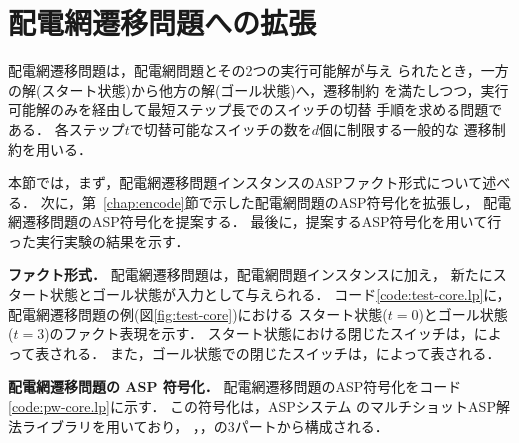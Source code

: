 \section{配電網遷移問題への拡張}\label{chap:core}




配電網遷移問題は，配電網問題とその2つの実行可能解が与え
られたとき，一方の解(スタート状態)から他方の解(ゴール状態)へ，遷移制約
を満たしつつ，実行可能解のみを経由して最短ステップ長でのスイッチの切替
手順を求める問題である．
各ステップ$t$で切替可能なスイッチの数を$d$個に制限する一般的な
遷移制約を用いる．

本節では，まず，配電網遷移問題インスタンスのASPファクト形式について述べる．
次に，第~\ref{chap:encode}節で示した配電網問題のASP符号化を拡張し，
配電網遷移問題のASP符号化を提案する．
最後に，提案するASP符号化を用いて行った実行実験の結果を示す．

\textbf{ファクト形式．}
配電網遷移問題は，配電網問題インスタンスに加え，
新たにスタート状態とゴール状態が入力として与えられる．
コード\ref{code:test-core.lp}に，
配電網遷移問題の例(図\ref{fig:test-core})における
スタート状態($t=0$)とゴール状態($t=3$)のファクト表現を示す．
スタート状態における閉じたスイッチは，によって表される．
また，ゴール状態での閉じたスイッチは，によって表される．

\textbf{配電網遷移問題の ASP 符号化．}
%
配電網遷移問題のASP符号化をコード\ref{code:pw-core.lp}に示す．
この符号化は，ASPシステム \clingo のマルチショットASP解法ライブラリを用いており，
，，の3パートから構成される．

